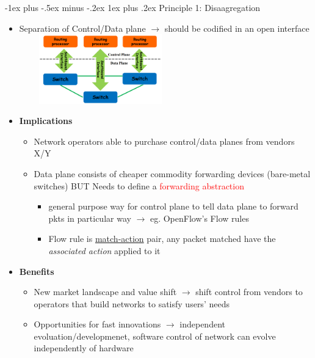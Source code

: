 \documentclass[10pt,landscape]{article}
\makeatletter
\newcommand{\subsubsubsection}{\@startsection{subsubsection}{3}{0mm}%
                                {-1ex plus -.5ex minus -.2ex}%
                                {1ex plus .2ex}%
                                {\normalfont\scriptsize\bfseries}}
\makeatother
\begin{document}
\begin{multicols*}{3}
\subsubsubsection{Principle 1: Disaagregation}
\begin{itemize}[topsep=0pt,noitemsep,wide=0pt, leftmargin=\dimexpr{} + 2\relax]
  \item Separation of Control/Data plane $\rightarrow$ should be codified in an open interface \\ 
  \includegraphics*[width=7cm, height=3cm]{images/controldataplane.png}
  \item \textbf{Implications}
  \begin{itemize}[topsep=0pt,noitemsep,wide=0pt, leftmargin=\dimexpr{} + 2\relax]
    \item Network operators able to purchase control/data planes from vendors X/Y
    \item Data plane consists of cheaper commodity forwarding devices (bare-metal switches) BUT Needs to define a \textcolor{red}{forwarding abstraction}
    \begin{itemize}[topsep=0pt,noitemsep,wide=0pt, leftmargin=\dimexpr{} + 2\relax]
      \item general purpose way for control plane to tell data plane to forward pkts in particular way $\rightarrow$ eg. OpenFlow's Flow rules 
      \item Flow rule is \underline{match-action} pair, any packet matched have the \textit{associated action} applied to it
    \end{itemize}
  \end{itemize}
  \item \textbf{Benefits}
  \begin{itemize}[topsep=0pt,noitemsep,wide=0pt, leftmargin=\dimexpr{} + 2\relax]
    \item New market landscape and value shift $\rightarrow$ shift control from vendors to operators that build networks to satisfy users' needs
    \item Opportunities for fast innovations $\rightarrow$ independent evoluation/developmenet, software control of network can evolve independently of hardware
  \end{itemize}
\end{itemize}


\end{multicols*}
\end{document}
